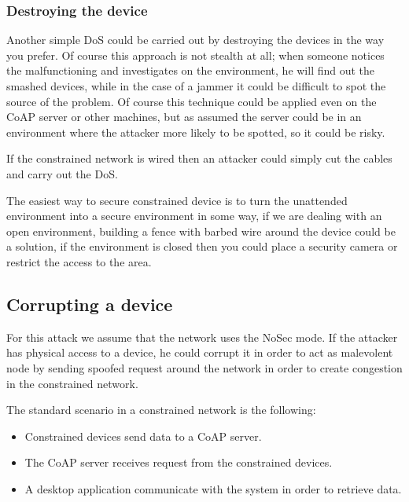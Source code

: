 	\subsubsection{Destroying the device}
	Another simple DoS could be carried out by destroying the devices in the way you prefer.\newline
	Of course this approach is not stealth at all; when someone notices the malfunctioning and investigates on the environment, he will find out the smashed devices, while in the case of a jammer it could be difficult to spot the source of the problem.\newline
	Of course this technique could be applied even on the CoAP server or other machines, but as assumed the server could be in an environment where the attacker more likely to be spotted, so it could be risky.\newline
	
	If the constrained network is wired then an attacker could simply cut the cables and carry out the DoS.\newline
	
	The easiest way to secure constrained device is to turn the unattended environment into a secure environment in some way, if we are dealing with an open environment, building a fence with barbed wire around the device could be a solution, if the environment is closed then you could place a security camera or restrict the access to the area.\newline
	
	\subsection{Corrupting a device}
	For this attack we assume that the network uses the NoSec mode.\newline
	If the attacker has physical access to a device, he could corrupt it in order to act as malevolent node by sending spoofed request around the network in order to create congestion in the constrained network.\newline
	
	The standard scenario in a constrained network is the following:
	\begin{itemize}
		\item Constrained devices send data to a CoAP server.
		\item The CoAP server receives request from the constrained devices.
		\item A desktop application communicate with the system in order to retrieve data.
	\end{itemize}

